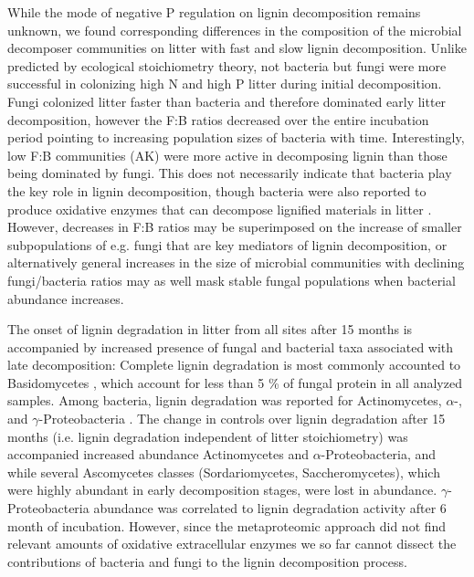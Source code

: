 While the mode of negative P regulation on lignin decomposition remains unknown, we found corresponding differences in the composition of the microbial decomposer communities on litter with fast and slow lignin decomposition. Unlike predicted by ecological stoichiometry theory, not bacteria but fungi were more successful in colonizing high N and high P litter during initial decomposition. Fungi colonized litter faster than bacteria and therefore dominated early litter decomposition, however the F:B ratios decreased over the entire incubation period pointing to increasing population sizes of bacteria with time. Interestingly, low F:B communities (AK) were more active in decomposing lignin than those being dominated by fungi. This does not necessarily indicate that bacteria play the key role in lignin decomposition, though bacteria were also reported to produce oxidative enzymes that can decompose lignified materials in litter \cite{Bugg2011}. However, decreases in F:B ratios may be superimposed on the increase of smaller subpopulations of e.g. fungi that are key mediators of lignin decomposition, or alternatively general increases in the size of microbial communities with declining fungi/bacteria ratios may as well mask stable fungal populations when  bacterial abundance increases. 

The onset of lignin degradation in litter from all sites after 15 months is accompanied by increased presence of fungal and bacterial taxa associated with late decomposition: Complete lignin degradation is most commonly accounted to Basidomycetes \cite{Berg2008}, which account for less than 5 \% of fungal protein in all analyzed samples. Among bacteria, lignin degradation was reported for Actinomycetes, $\alpha$-, and $\gamma$-Proteobacteria \cite{Bugg2011}. The change in controls over lignin degradation  after 15 months (i.e. lignin degradation independent of litter stoichiometry) was accompanied increased abundance Actinomycetes and $\alpha$-Proteobacteria, and while several Ascomycetes classes (Sordariomycetes, Saccheromycetes), which were highly abundant in early decomposition stages, were lost in abundance. $\gamma$-Proteobacteria abundance was correlated to lignin degradation activity after 6 month of incubation. However, since the metaproteomic approach did not find relevant amounts of oxidative extracellular enzymes we so far cannot dissect the contributions of bacteria and fungi to the lignin decomposition process. 

